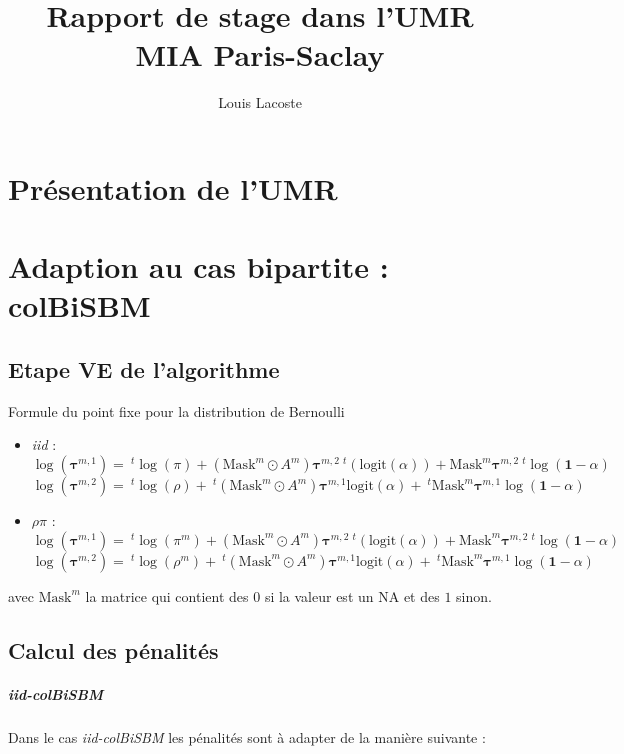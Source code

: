 \documentclass[12pt,a4paper]{rapport1}
\title{Rapport de stage dans l'UMR MIA Paris-Saclay}
\author{Louis Lacoste}
\begin{document}
\maketitle
\tableofcontents

\chapter{Présentation de l'UMR}

\chapter{Adaption au cas bipartite : colBiSBM}

\section{Etape VE de l'algorithme}
Formule du point fixe pour la distribution de Bernoulli
\begin{itemize}
    \item \textit{iid} :
    \[ \log(\bm{\tau}^{m,1}) = ~^{t}\log(\pi) + (\text{Mask}^{m} \odot A^{m})
        \bm{\tau}^{m,2} ~^{t}(\text{logit}(\alpha)) + \text{Mask}^{m} 
        \bm{\tau}^{m,2} ~^{t}\log(\bm{1} - \alpha) \]
    \[ \log(\bm{\tau}^{m,2}) = ~^{t}\log(\rho) + ~^{t}(\text{Mask}^{m} \odot A^{m}) 
    \bm{\tau}^{m,1} \text{logit}(\alpha) + ~^{t}\text{Mask}^{m} 
        \bm{\tau}^{m,1} \log(\bm{1} - \alpha) \]
    \item $\rho\pi$ :
        \[ \log(\bm{\tau}^{m,1}) = ~^{t}\log(\pi^{m}) + (\text{Mask}^{m} \odot A^{m})
            \bm{\tau}^{m,2} ~^{t}(\text{logit}(\alpha)) + \text{Mask}^{m} 
            \bm{\tau}^{m,2} ~^{t}\log(\bm{1} - \alpha) \]
        \[ \log(\bm{\tau}^{m,2}) = ~^{t}\log(\rho^{m}) + ~^{t}(\text{Mask}^{m} \odot A^{m}) 
        \bm{\tau}^{m,1} \text{logit}(\alpha) + ~^{t}\text{Mask}^{m} 
            \bm{\tau}^{m,1} \log(\bm{1} - \alpha) \]
\end{itemize}

avec $\text{Mask}^{m}$ la matrice qui contient des $0$ si la valeur est un NA et
des $1$ sinon.

\section{Calcul des pénalités}

\paragraph*{\textit{iid-colBiSBM}}
Dans le cas \textit{iid-colBiSBM} les pénalités sont à adapter de la manière 
suivante :
\end{document}
